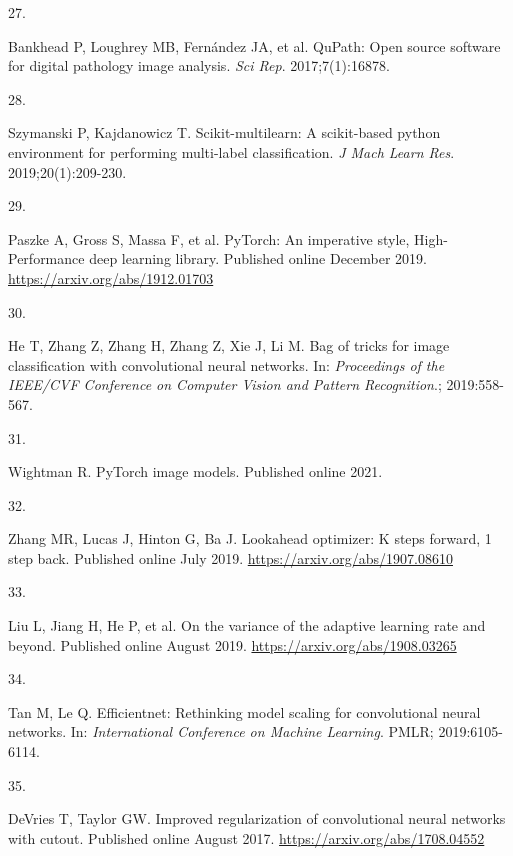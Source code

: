 \documentclass[
  12pt,
  a5,margin=2cmpaper,
]{article}
\newlength{\cslhangindent}
\newlength{\csllabelwidth}
\newlength{\cslentryspacingunit} %
\newenvironment{CSLReferences}[2] %
 {%
  \setlength{\parindent}{0pt}
  \ifodd #1
  \let\oldpar\par
  \def\par{\hangindent=\cslhangindent\oldpar}
  \fi
  \setlength{\parskip}{#2\cslentryspacingunit}
 }%
 {}
\newcommand{\CSLLeftMargin}[1]{\parbox[t]{\csllabelwidth}{#1}}
\newcommand{\CSLRightInline}[1]{\parbox[t]{\linewidth - \csllabelwidth}{#1}\break}
\begin{document}
\begin{CSLReferences}{0}{0}
\leavevmode{}%
\CSLLeftMargin{27. }%
\CSLRightInline{Bankhead P, Loughrey MB, Fernández JA, et al. {QuPath}:
Open source software for digital pathology image analysis. \emph{Sci
Rep}. 2017;7(1):16878.}

\leavevmode{}%
\CSLLeftMargin{28. }%
\CSLRightInline{Szymanski P, Kajdanowicz T. Scikit-multilearn: A
scikit-based python environment for performing multi-label
classification. \emph{J Mach Learn Res}. 2019;20(1):209-230.}

\leavevmode{}%
\CSLLeftMargin{29. }%
\CSLRightInline{Paszke A, Gross S, Massa F, et al. {PyTorch}: An
imperative style, {High-Performance} deep learning library. Published
online December 2019. \url{https://arxiv.org/abs/1912.01703}}

\leavevmode{}%
\CSLLeftMargin{30. }%
\CSLRightInline{He T, Zhang Z, Zhang H, Zhang Z, Xie J, Li M. Bag of
tricks for image classification with convolutional neural networks. In:
\emph{Proceedings of the {IEEE/CVF} Conference on Computer Vision and
Pattern Recognition}.; 2019:558-567.}

\leavevmode{}%
\CSLLeftMargin{31. }%
\CSLRightInline{Wightman R. {PyTorch} image models. Published online
2021.}

\leavevmode{}%
\CSLLeftMargin{32. }%
\CSLRightInline{Zhang MR, Lucas J, Hinton G, Ba J. Lookahead optimizer:
K steps forward, 1 step back. Published online July 2019.
\url{https://arxiv.org/abs/1907.08610}}

\leavevmode{}%
\CSLLeftMargin{33. }%
\CSLRightInline{Liu L, Jiang H, He P, et al. On the variance of the
adaptive learning rate and beyond. Published online August 2019.
\url{https://arxiv.org/abs/1908.03265}}

\leavevmode{}%
\CSLLeftMargin{34. }%
\CSLRightInline{Tan M, Le Q. Efficientnet: Rethinking model scaling for
convolutional neural networks. In: \emph{International Conference on
Machine Learning}. PMLR; 2019:6105-6114.}

\leavevmode{}%
\CSLLeftMargin{35. }%
\CSLRightInline{DeVries T, Taylor GW. Improved regularization of
convolutional neural networks with cutout. Published online August 2017.
\url{https://arxiv.org/abs/1708.04552}}


\end{CSLReferences}
\end{document}
